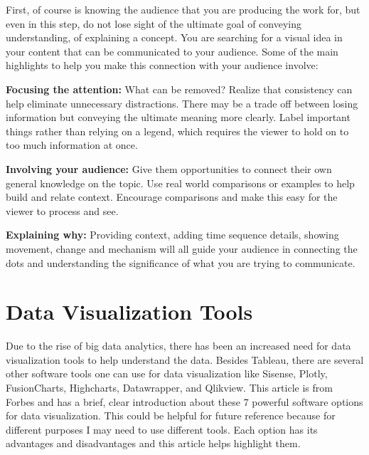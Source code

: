 \documentclass[]{book}
\theoremstyle{definition}
\theoremstyle{definition}
\theoremstyle{definition}
\theoremstyle{remark}
\begin{document}
First, of course is knowing the audience that you are producing the work
for, but even in this step, do not lose sight of the ultimate goal of
conveying understanding, of explaining a concept. You are searching for
a visual idea in your content that can be communicated to your audience.
Some of the main highlights to help you make this connection with your
audience involve:

\textbf{Focusing the attention:} What can be removed? Realize that
consistency can help eliminate unnecessary distractions. There may be a
trade off between losing information but conveying the ultimate meaning
more clearly. Label important things rather than relying on a legend,
which requires the viewer to hold on to too much information at once.

\textbf{Involving your audience:} Give them opportunities to connect
their own general knowledge on the topic. Use real world comparisons or
examples to help build and relate context. Encourage comparisons and
make this easy for the viewer to process and see.

\textbf{Explaining why:} Providing context, adding time sequence
details, showing movement, change and mechanism will all guide your
audience in connecting the dots and understanding the significance of
what you are trying to communicate.

\section{Data Visualization Tools}\label{data-visualization-tools}

Due to the rise of big data analytics, there has been an increased need
for data visualization tools to help understand the data. Besides
Tableau, there are several other software tools one can use for data
visualization like Sisense, Plotly, FusionCharts, Highcharts,
Datawrapper, and Qlikview. This article is from Forbes and has a brief,
clear introduction about these 7 powerful software options for data
visualization. This could be helpful for future reference because for
different purposes I may need to use different tools. Each option has
its advantages and disadvantages and this article helps highlight them.
\end{document}
